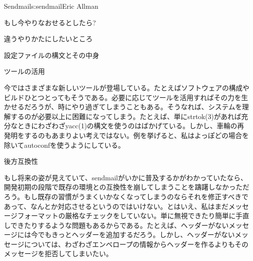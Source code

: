 \begin{aosachapter}{Sendmail}{s:sendmail}{Eric Allman}
\begin{aosasect1}{もし今やりなおせるとしたら?}
\begin{aosasect2}{違うやりかたにしたいところ}
\begin{aosasect3}{設定ファイルの構文とその中身}
\end{aosasect3}

\begin{aosasect3}{ツールの活用}

今ではさまざまな新しいツールが登場している。たとえばソフトウェアの構成やビルドひとつとってもそうである。必要に応じてツールを活用すればその力を生かせるだろうが、時にやり過ぎてしまうこともある。そうなれば、システムを理解するのが必要以上に困難になってしまう。たとえば、単にstrtok(3)があれば充分なときにわざわざyacc(1)の構文を使うのはばかげている。しかし、車輪の再発明をするのもあまりよい考えではない。例を挙げると、私はよっぽどの場合を除いてautoconfを使うようにしている。

\end{aosasect3}

\begin{aosasect3}{後方互換性}

もし将来の姿が見えていて、sendmailがいかに普及するかがわかっていたなら、開発初期の段階で既存の環境との互換性を崩してしまうことを躊躇しなかっただろう。もし既存の習慣がうまくいかなくなってしまうのならそれを修正すべきであって、なんとか対応させるというのではいけない。とはいえ、私はまだメッセージフォーマットの厳格なチェックをしていない。単に無視できたり簡単に手直しできたりするような問題もあるからである。たとえば、ヘッダーがないメッセージには今でもきっとヘッダーを追加するだろう。しかし、ヘッダーがないメッセージについては、わざわざエンベロープの情報からヘッダーを作るよりもそのメッセージを拒否してしまいたい。


\end{aosasect3}
\end{aosasect2}
\end{aosasect1}
\end{aosachapter}
